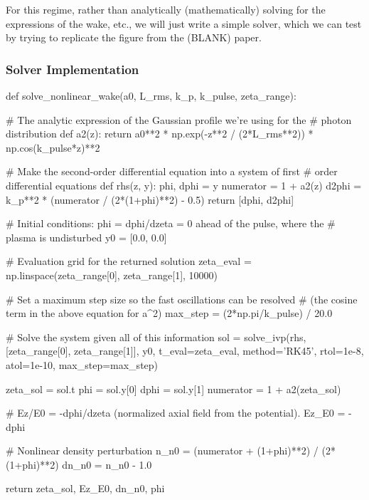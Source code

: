     For this regime, rather than analytically (mathematically) solving for
    the expressions of the wake, etc., we will just write a simple solver, 
    which we can test by trying to replicate the figure from the (BLANK) paper.

    \subsubsection{Solver Implementation}

    \begin{pythoncode}
    def solve_nonlinear_wake(a0, L_rms, k_p, k_pulse, zeta_range):

        # The analytic expression of the Gaussian profile we're using for the
        # photon distribution
        def a2(z):
            return a0**2 * np.exp(-z**2 / (2*L_rms**2)) * np.cos(k_pulse*z)**2

        # Make the second-order differential equation into a system of first
        # order differential equations
        def rhs(z, y):
            phi, dphi = y
            numerator = 1 + a2(z)
            d2phi = k_p**2 * (numerator / (2*(1+phi)**2) - 0.5)
            return [dphi, d2phi]

        # Initial conditions: phi = dphi/dzeta = 0 ahead of the pulse, where the
        # plasma is undisturbed
        y0 = [0.0, 0.0]

        # Evaluation grid for the returned solution
        zeta_eval = np.linspace(zeta_range[0], zeta_range[1], 10000)

        # Set a maximum step size so the fast oscillations can be resolved
        # (the cosine term in the above equation for a^2)
        max_step = (2*np.pi/k_pulse) / 20.0

        # Solve the system given all of this information
        sol = solve_ivp(rhs, [zeta_range[0], zeta_range[1]], y0, t_eval=zeta_eval, method='RK45', rtol=1e-8, atol=1e-10, max_step=max_step)

        zeta_sol = sol.t
        phi = sol.y[0]
        dphi = sol.y[1]
        numerator = 1 + a2(zeta_sol)

        # Ez/E0 = -dphi/dzeta (normalized axial field from the potential).
        Ez_E0 = -dphi

        # Nonlinear density perturbation
        n_n0 = (numerator + (1+phi)**2) / (2*(1+phi)**2)
        dn_n0 = n_n0 - 1.0

        return zeta_sol, Ez_E0, dn_n0, phi
    \end{pythoncode}

